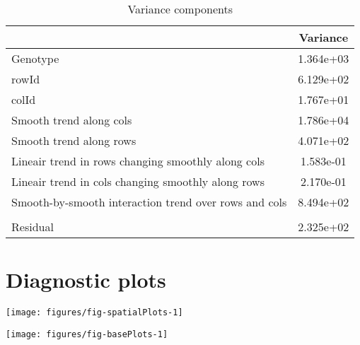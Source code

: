 \documentclass[a4paper,11pt]{article}\usepackage[]{graphicx}\usepackage[]{color}
\makeatletter
\def\maxwidth{ %
  \ifdim\Gin@nat@width>\linewidth
    \linewidth
  \else
    \Gin@nat@width
  \fi
}
\newenvironment{knitrout}{}{} %
\makeatother
\begin{document}
\begin{table}[ht]
\begin{flushleft}
\caption{Variance components} 
\label{varComps}
\begin{tabular}{lc}
  \hline
 & Variance \\ 
  \hline
Genotype & 1.364e+03 \\ 
  rowId & 6.129e+02 \\ 
  colId & 1.767e+01 \\ 
  Smooth trend along cols & 1.786e+04 \\ 
  Smooth trend along rows & 4.071e+02 \\ 
  Lineair trend in rows changing smoothly along cols & 1.583e-01 \\ 
  Lineair trend in cols changing smoothly along rows & 2.170e-01 \\ 
  Smooth-by-smooth interaction trend over rows and cols & 8.494e+02 \\ 
   &  \\ 
  Residual & 2.325e+02 \\ 
   \hline
\end{tabular}
\end{flushleft}
\end{table}

\clearpage

\section{Diagnostic plots}
\begin{knitrout}
\color{fgcolor}

{\centering \texttt{[image: figures/fig-spatialPlots-1]} 

}



\end{knitrout}
\newpage
\begin{knitrout}
\color{fgcolor}

{\centering \texttt{[image: figures/fig-basePlots-1]} 

}



\end{knitrout}
\newpage
\end{document}
